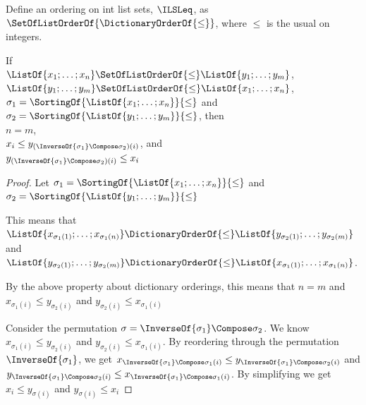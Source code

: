 \documentclass[sigplan,acmsmall]{acmart}
\begin{document}
\begin{definition}
  Define an ordering on int list sets, $\ILSLeq$, as
  $\SetOfListOrderOf{\DictionaryOrderOf{\leq}}$, where $\leq$ is the usual on
  integers.
\end{definition}

\begin{lemma}
  \label{lem:spec-set-list-perm}
  If \\
  $\ListOf{x_1;\ldots;x_n} \SetOfListOrderOf{\leq} \ListOf{y_1;\ldots;y_m}$,\\
  $\ListOf{y_1;\ldots;y_m} \SetOfListOrderOf{\leq} \ListOf{x_1;\ldots;x_n}$,\\
  $\sigma_1 = \SortingOf{\ListOf{x_1;\ldots;x_n}}{\leq}$ and\\
  $\sigma_2 = \SortingOf{\ListOf{y_1;\ldots;y_m}}{\leq}$, then\\
  $n = m$,\\
  $x_i \leq y_{(\InverseOf{\sigma_1} \Compose \sigma_2)(i)}$, and\\
  $y_{(\InverseOf{\sigma_1} \Compose \sigma_2)(i)} \leq x_i$
\end{lemma}
\begin{proof}
    Let $\sigma_1 = \SortingOf{\ListOf{x_1;\ldots;x_n}}{\leq}$ and
    $\sigma_2 = \SortingOf{\ListOf{y_1;\ldots;y_m}}{\leq}$
    
    This means that
    $\ListOf{x_{\sigma_1(1)};\ldots;x_{\sigma_1(n)}} \DictionaryOrderOf{\leq}
    \ListOf{y_{\sigma_2(1)};\ldots;y_{\sigma_2(m)}}$ and
    $\ListOf{y_{\sigma_2(1)};\ldots;y_{\sigma_2(m)}} \DictionaryOrderOf{\leq}
    \ListOf{x_{\sigma_1(1)};\ldots;x_{\sigma_1(n)}}$.

    By the above property about dictionary orderings, this means that $n=m$ and
    $x_{\sigma_1(i)} \leq y_{\sigma_2(i)}$ and $y_{\sigma_2(i)} \leq
    x_{\sigma_1(i)}$

    Consider the permutation $\sigma = \InverseOf{\sigma_1} \Compose \sigma_2$.
    We know $x_{\sigma_1(i)} \leq y_{\sigma_2(i)}$ and $y_{\sigma_2(i)} \leq
    x_{\sigma_1(i)}$.  By reordering through the permutation
    $\InverseOf{\sigma_1}$, we get $x_{\InverseOf{\sigma_1} \Compose \sigma_1(i)}
    \leq y_{\InverseOf{\sigma_1} \Compose \sigma_2(i)}$ and
    $y_{\InverseOf{\sigma_1} \Compose \sigma_2(i)} \leq 
    x_{\InverseOf{\sigma_1} \Compose \sigma_1(i)}$.  By simplifying we get
    $x_i
    \leq y_{\sigma(i)}$ and
    $y_{\sigma(i)} \leq x_{i}$
\end{proof}
\end{document}
